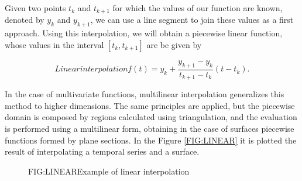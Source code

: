 
Given two points $t_k$ and $t_{k+1}$ for which the values of our function are
known, denoted by $y_k$ and $y_{k+1}$, we can use a line segment to join these
values as a first approach. Using this interpolation, we will obtain a
piecewise linear function, whose values in the interval $[t_k, t_{k+1}]$ are
be given by

\begin{equation}[]{Linear interpolation}
 f(t)= y_{k}+\frac{y_{k+1}-y_{k}}{t_{k+1}-t_{k}}\left(t-t_{k}\right).
\end{equation}

In the case of multivariate functions, multilinear interpolation
generalizes this method to higher dimensions.
The same principles are applied, but the piecewise domain is composed
by regions calculated using triangulation, and the evaluation is performed
using a multilinear form, obtaining in the case of surfaces piecewise
functions formed by plane sections. In the Figure \ref{FIG:LINEAR} it is plotted
the result of interpolating a temporal series and a surface.


\begin{figure}[Example of linear interpolation]{FIG:LINEAR}{Example of linear interpolation}
   \quad
\end{figure}
